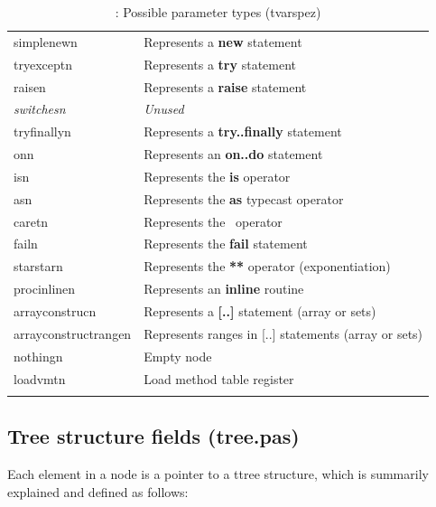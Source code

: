 \documentclass [12pt]{article}
\begin{document}
\begin{longtable}{|l|p{10cm}|}
\textsf{simplenewn}& 
		\textsf{Represents a }\textsf{\textbf{new}}\textsf{ statement } \\
\textsf{tryexceptn}& 
		\textsf{Represents a }\textsf{\textbf{try}}\textsf{ statement} \\
\textsf{raisen}& 
		\textsf{Represents a }\textsf{\textbf{raise}}\textsf{ statement} \\
\textsf{\textit{switchesn}}& 
		\textsf{\textit{Unused}} \\
\textsf{tryfinallyn}& 
		\textsf{Represents a }\textsf{\textbf{try..finally}}\textsf{ statement} \\
\textsf{onn}& 
		\textsf{Represents an }\textsf{\textbf{on..do}}\textsf{ statement} \\
\textsf{isn}& 
		\textsf{Represents the }\textsf{\textbf{is}}\textsf{ operator} \\
\textsf{asn}& 
		\textsf{Represents the }\textsf{\textbf{as}}\textsf{ typecast operator} \\
\textsf{caretn}& 
		\textsf{Represents the \  operator} \\
\textsf{failn}& 
		\textsf{Represents the }\textsf{\textbf{fail}}\textsf{ statement} \\
\textsf{starstarn}& 
		\textsf{Represents the }\textsf{\textbf{**}}\textsf{ operator (exponentiation)} \\
\textsf{procinlinen}& 
		\textsf{Represents an }\textsf{\textbf{inline}}\textsf{ routine} \\
\textsf{arrayconstrucn}& 
		\textsf{Represents a }\textsf{\textbf{[..]}}\textsf{ statement (array or sets)} \\
\textsf{arrayconstructrangen}& 
		\textsf{Represents ranges in [..] statements (array or sets)} \\
\textsf{nothingn}& 
		\textsf{Empty node} \\
\textsf{loadvmtn}& 
		\textsf{Load method table register} \\
\hline
\caption{: Possible parameter types (tvarspez)}
\label{tab6}
\end{longtable}

\subsection{Tree structure fields (tree.pas)}
\label{subsec:mylabel2}

Each element in a node is a pointer to a ttree structure, which is summarily 
explained and defined as follows:
\end{document}
